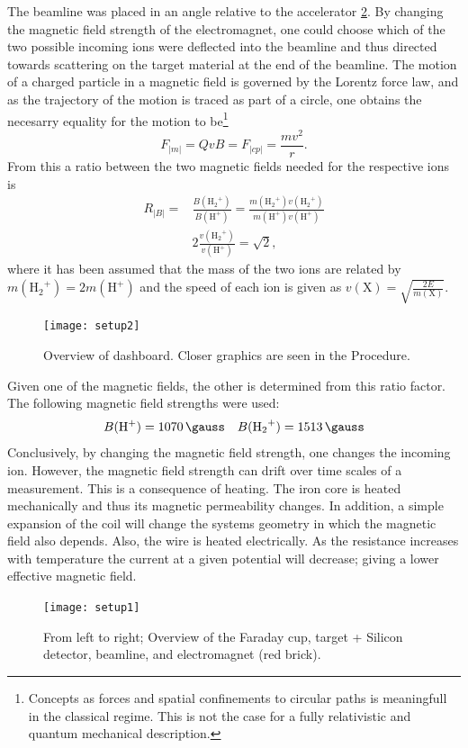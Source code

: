The beamline was placed in an angle relative to the accelerator
\cref{fig_setup1}. By changing the magnetic field strength of the
electromagnet, one could choose which of the two possible incoming ions were
deflected into the beamline and thus directed towards scattering on the target material at the end of the beamline. 
The motion of a charged particle in a magnetic field is governed by the Lorentz
force law, and as the trajectory of the motion is traced as part of a circle,
one obtains the necesarry equality for the motion to be\footnote{Concepts as
forces and spatial confinements to circular paths is meaningfull in the
classical regime. This is not the case for a fully relativistic and quantum
mechanical description.}
\begin{equation}
F_|m| = QvB = F_|cp| = \frac{mv^2}{r}.
\end{equation}
From this a ratio between the two magnetic fields needed for the respective
ions is
\begin{align}
    R_|B| = & \frac{B({\mathrm{H_2}^+})}{B(\mathrm{H^+})} =
    \frac{m({\mathrm{H_2}^+})
    v({\mathrm{H_2}^+})}{m(\mathrm{H^+})v(\mathrm{H^+})}\\
    & 2 \frac{v({\mathrm{H_2}^+})}{v(\mathrm{H^+})} = \sqrt{2},
\end{align}
%
where it has been assumed that the mass of the two ions are related by
$m(\mathrm{{H_2}^+}) = 2m(\mathrm{H^+}) $ and the speed of each ion is given as
$v(\mathrm{X}) = \sqrt{\frac{2E}{m(\mathrm{X})}}$.
%
%
\begin{figure}[t]
    \centering
    \texttt{[image: setup2]}
    \caption{Overview of dashboard. Closer graphics are seen in the Procedure.}
    \label{fig_setup2}
\end{figure}
%
Given one of the magnetic fields, the other is determined from this ratio
factor. The following magnetic field strengths were used:
\begin{equation}
    B(\mathrm{H^+}) = \SI{1070}{\gauss} \quad B(\mathrm{{H_2}^+}) = \SI{1513}{\gauss}
\end{equation}
Conclusively, by changing the magnetic field strength, one changes the
incoming ion. However, the magnetic field strength can drift over time scales
of a measurement. This is a consequence of heating. The iron core is heated
mechanically and thus its magnetic permeability changes. In addition, a simple
expansion of the coil will change the systems geometry in which the magnetic
field also depends. Also, the wire is heated electrically. As the resistance
increases with temperature the current at a given potential will decrease;
giving a lower effective magnetic field.
\begin{figure}[t]
    \centering
    \texttt{[image: setup1]}
    \caption{From left to right; Overview of the Faraday cup, target + Silicon detector, beamline, and electromagnet (red brick).}
    \label{fig_setup1}
\end{figure}

